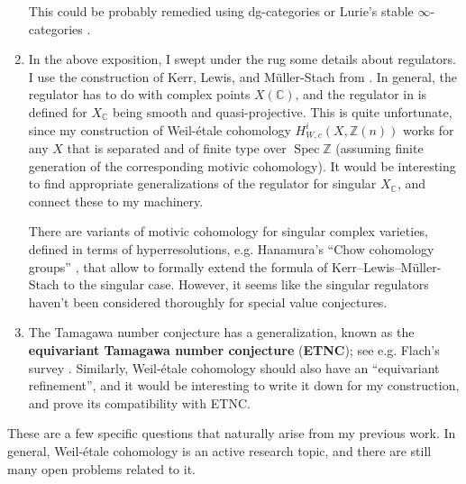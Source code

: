 \documentclass{article}
\DeclareMathOperator{\Spec}{Spec}
\newcommand{\ZZ}{\mathbb{Z}}
\newcommand{\CC}{\mathbb{C}}
\begin{document}
\begin{enumerate}
  This could be probably remedied using dg-categories \cite{Toen-2011} or
  Lurie's stable $\infty$-categories \cite{Lurie-stable-oo}.

\item In the above exposition, I swept under the rug some details about
  regulators. I use the construction of Kerr, Lewis, and Müller-Stach from
  \cite{KLMS}. In general, the regulator has to do with complex points
  $X (\CC)$, and the regulator in \cite{KLMS} is defined for $X_\CC$ being
  smooth and quasi-projective. This is quite unfortunate, since my construction
  of Weil-étale cohomology $H^i_{W,c} (X, \ZZ (n))$ works for any $X$ that is
  separated and of finite type over $\Spec \ZZ$ (assuming finite generation of
  the corresponding motivic cohomology). It would be interesting to find
  appropriate generalizations of the regulator for singular $X_\CC$, and connect
  these to my machinery.

  There are variants of motivic cohomology for singular complex varieties,
  defined in terms of hyperresolutions, e.g. Hanamura's
  ``Chow cohomology groups'' \cite{Hanamura-2000}, that allow to formally extend
  the formula of Kerr--Lewis--Müller-Stach to the singular case. However,
  it seems like the singular regulators haven't been considered thoroughly for
  special value conjectures.

\item The Tamagawa number conjecture has a generalization, known as the
  \textbf{equivariant Tamagawa number conjecture} (\textbf{ETNC});
  see e.g. Flach's survey \cite{Flach-ETNC}. Similarly, Weil-étale cohomology
  should also have an ``equivariant refinement'', and it would be interesting to
  write it down for my construction, and prove its compatibility with ETNC.
\end{enumerate}

These are a few specific questions that naturally arise from my previous
work. In general, Weil-étale cohomology is an active research topic, and there
are still many open problems related to it.

\pagebreak



\end{document}
